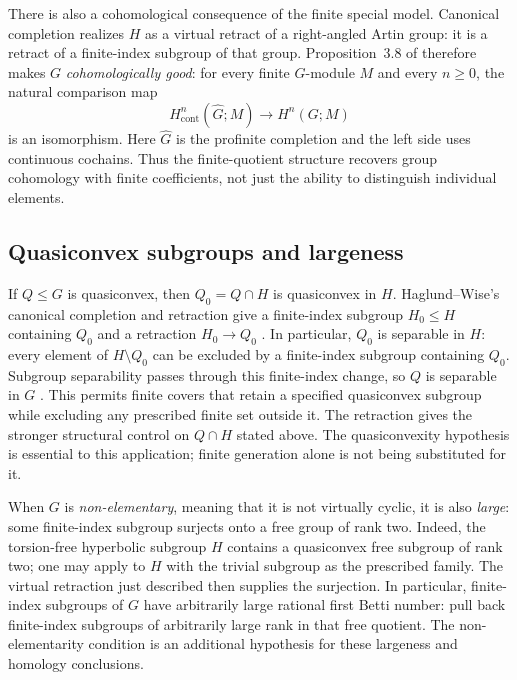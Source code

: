 There is also a cohomological consequence of the finite special model.
Canonical completion realizes $H$ as a virtual retract of a
right-angled Artin group: it is a retract of a finite-index subgroup of
that group. Proposition~3.8 of
\cite{MinasyanZalesskii2016} therefore makes $G$ \emph{cohomologically
good}: for every finite $G$-module $M$ and every $n\geq0$, the natural
comparison map
\[
H^n_{\mathrm{cont}}(\widehat G;M)\longrightarrow H^n(G;M)
\]
is an isomorphism. Here $\widehat G$ is the profinite completion and the
left side uses continuous cochains. Thus the finite-quotient structure
recovers group cohomology with finite coefficients, not just the
ability to distinguish individual elements.

\subsection{Quasiconvex subgroups and largeness}

If $Q\leq G$ is quasiconvex, then $Q_0=Q\cap H$ is quasiconvex in $H$.
Haglund--Wise's canonical completion and retraction give a finite-index
subgroup $H_0\leq H$ containing $Q_0$ and a retraction
$H_0\to Q_0$ \cite[Section~6 and Theorem~7.3]{HaglundWise2008}.
In particular, $Q_0$ is separable in $H$: every element of
$H\setminus Q_0$ can be excluded by a finite-index subgroup containing
$Q_0$. Subgroup separability passes through this finite-index change,
so $Q$ is separable in $G$ \cite[Lemma~7.5]{HaglundWise2008}.
This permits finite covers that retain a specified quasiconvex
subgroup while excluding any prescribed finite set outside it. The
retraction gives the stronger structural control on $Q\cap H$ stated
above. The quasiconvexity hypothesis is essential to this application;
finite generation alone is not being substituted for it.

When $G$ is \emph{non-elementary}, meaning that it is not virtually
cyclic, it is also \emph{large}: some finite-index subgroup surjects
onto a free group of rank two. Indeed, the torsion-free hyperbolic
subgroup $H$ contains a quasiconvex free subgroup of rank two; one may
apply \cite[Theorem~1.11]{KielakLinton2024Virtually} to $H$ with the
trivial subgroup as the prescribed family. The virtual retraction just
described then supplies the surjection. In particular, finite-index
subgroups of $G$ have arbitrarily large rational first Betti number: pull back
finite-index subgroups of arbitrarily large rank in that free quotient.
The non-elementarity condition is an additional hypothesis for these
largeness and homology conclusions.


